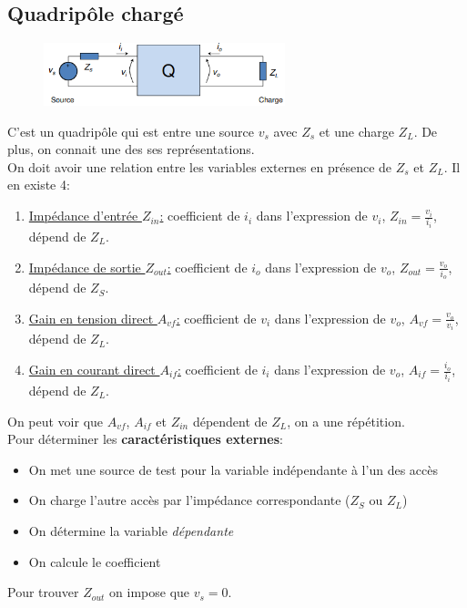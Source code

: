 \documentclass{report}
\begin{document}
\subsection{Quadripôle chargé}
\begin{figure}[H]
\centering
\includegraphics[width=7cm]{img/quadriCharge.png}
\end{figure}
C'est un quadripôle qui est entre une source $v_s$ avec $Z_s$ et une charge $Z_L$. De plus, on connait une des ses représentations.\\
On doit avoir une relation entre les variables externes en présence de $Z_s$ et $Z_L$. Il en existe 4:
\begin{enumerate}
\item \underline{Impédance d'entrée $Z_{in}$:} coefficient de $i_i$ dans l'expression de $v_i$, $Z_{in} = \frac{v_i}{i_i}$, dépend de $Z_L$.
\item \underline{Impédance de sortie $Z_{out}$:} coefficient de $i_o$ dans l'expression de $v_o$, $Z_{out} = \frac{v_o}{i_o}$, dépend de $Z_S$.
\item \underline{Gain en tension direct $A_{vf}$:} coefficient de $v_i$ dans l'expression de $v_o$, $A_{vf} = \frac{v_o}{v_i}$, dépend de $Z_L$.
\item \underline{Gain en courant direct $A_{if}$:} coefficient de $i_i$ dans l'expression de $v_o$, $A_{if} = \frac{i_o}{i_i}$, dépend de $Z_L$.
\end{enumerate}

On peut voir que $A_{vf}$, $A_{if}$ et $Z_{in}$ dépendent de $Z_L$, on a une répétition.\\
Pour déterminer les \textbf{caractéristiques externes}:
\begin{itemize}
\item On met une source de test pour la variable indépendante à l'un des accès
\item On charge l'autre accès par l'impédance correspondante ($Z_S$ ou $Z_L$)
\item On détermine la variable \textit{dépendante}
\item On calcule le coefficient
\end{itemize}
Pour trouver $Z_{out}$ on impose que $v_s = 0$.
\end{document}
